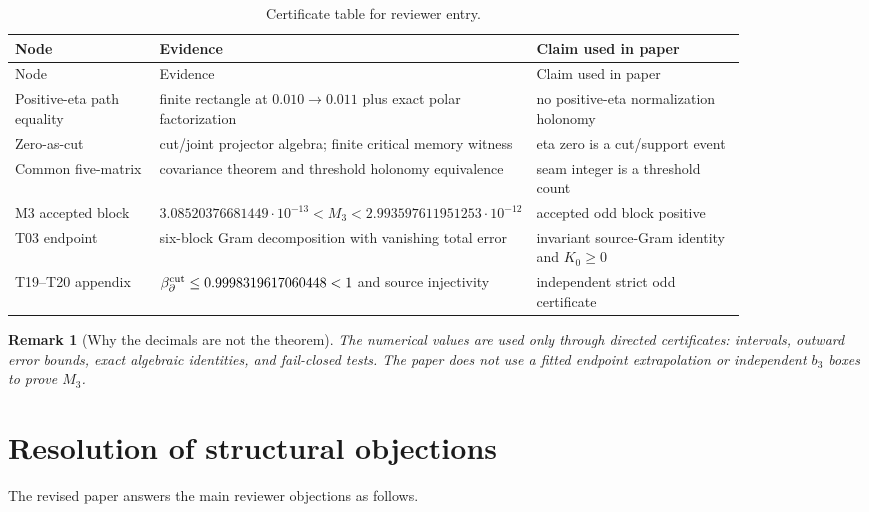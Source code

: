 \documentclass[11pt]{article}
\newtheorem{remark}[theorem]{Remark}
\begin{document}
\begin{longtable}{p{0.22\linewidth}p{0.31\linewidth}p{0.32\linewidth}}
\caption{Certificate table for reviewer entry.}\label{tab:certificates}\\
\toprule
Node & Evidence & Claim used in paper \\
\midrule
\endfirsthead
\toprule
Node & Evidence & Claim used in paper \\
\midrule
\endhead
Positive-eta path equality & finite rectangle at \(0.010\to0.011\) plus exact polar factorization & no positive-eta normalization holonomy \\
Zero-as-cut & cut/joint projector algebra; finite critical memory witness & eta zero is a cut/support event \\
Common five-matrix & covariance theorem and threshold holonomy equivalence & seam integer is a threshold count \\
M3 accepted block & \(3.08520376681449\cdot10^{-13}<M_3<2.993597611951253\cdot10^{-12}\) & accepted odd block positive \\
T03 endpoint & six-block Gram decomposition with vanishing total error & invariant source-Gram identity and \(K_0\ge0\) \\
T19--T20 appendix & \(\beta_\partial^{\rm cut}\le0.9998319617060448<1\) and source injectivity & independent strict odd certificate \\
\bottomrule
\end{longtable}

\begin{remark}[Why the decimals are not the theorem]
The numerical values are used only through directed certificates: intervals, outward error bounds, exact algebraic identities, and fail-closed tests.  The paper does not use a fitted endpoint extrapolation or independent \(b_3\) boxes to prove \(M_3\).
\end{remark}

\section{Resolution of structural objections}

The revised paper answers the main reviewer objections as follows.
\end{document}
